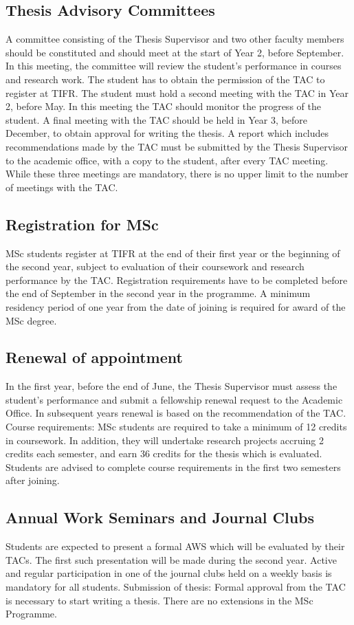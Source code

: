 \documentclass[a4paper]{extarticle}
\begin{document}
\subsection{Thesis Advisory Committees} A committee consisting of the Thesis
Supervisor and two other faculty members should be constituted and should meet
at the start of Year 2, before September. In this meeting, the committee will
review the student’s performance in courses and research work. The student has
to obtain the permission of the TAC to register at TIFR.  The student must hold
a second meeting with the TAC in Year 2, before May. In this meeting the TAC
should monitor the progress of the student. A final meeting with the TAC should
be held in Year 3, before December, to obtain approval for writing the thesis. A
report which includes recommendations made by the TAC must be submitted by the
Thesis Supervisor to the academic office, with a copy to the student, after
every TAC meeting.  While these three meetings are mandatory, there is no upper
limit to the number of meetings with the TAC.

\subsection{Registration for MSc}
MSc students register at TIFR at the end of their first year or the
beginning of the second year, subject to evaluation of their coursework and research
performance by the TAC. Registration requirements have to be completed before the end of
September in the second year in the programme. A minimum residency period of one year
from the date of joining is required for award of the MSc degree.

\subsection{Renewal of appointment}
In the first year, before the end of June, the Thesis Supervisor
must assess the student’s performance and submit a fellowship renewal request to the
Academic Office. In subsequent years renewal is based on the recommendation of the TAC.
Course requirements: MSc students are required to take a minimum of 12 credits in
coursework. In addition, they will undertake research projects accruing 2 credits each
semester, and earn 36 credits for the thesis which is evaluated. Students are advised to
complete course requirements in the first two semesters after joining.

\subsection{Annual Work Seminars and Journal Clubs}
Students are expected to present a formal
AWS which will be evaluated by their TACs. The first such presentation will be made
during the second year. Active and regular participation in one of the journal clubs held on a
weekly basis is mandatory for all students.
Submission of thesis: Formal approval from the TAC is necessary to start writing a thesis.
There are no extensions in the MSc Programme.
\end{document}
